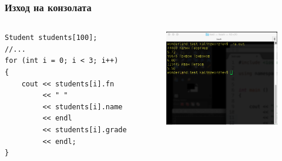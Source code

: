 \documentclass{beamer}
\begin{document}
\begin{frame}[fragile,label=current]
\frametitle{Изход на конзолата}



\begin{columns}[t]
  \begin{column}{0.5\textwidth}
      \vspace{-150px}
      \begin{flushleft}
      \begin{lstlisting}
Student students[100];
//...
for (int i = 0; i < 3; i++)
{
    cout << students[i].fn 
         << " "
         << students[i].name 
         << endl 
         << students[i].grade 
         << endl;
}
      \end{lstlisting}
      \end{flushleft} 
  \end{column}
  \begin{column}{0.5\textwidth}
  \includegraphics[width=5cm]{images/consoleout}
  \end{column}
\end{columns}


\end{frame}
\end{document}
